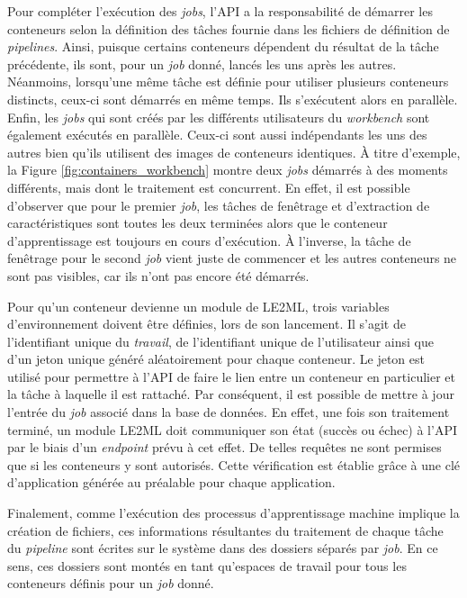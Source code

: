 Pour compléter l'exécution des \emph{jobs}, l'\acs{API} a la responsabilité de démarrer les conteneurs selon la définition des tâches fournie dans les fichiers de définition de \textit{pipelines}. Ainsi, puisque certains conteneurs dépendent du résultat de la tâche précédente, ils sont, pour un \emph{job} donné, lancés les uns après les autres. Néanmoins, lorsqu'une même tâche est définie pour utiliser plusieurs conteneurs distincts, ceux-ci sont démarrés en même temps. Ils s'exécutent alors en parallèle. Enfin, les \emph{jobs} qui sont créés par les différents utilisateurs du \textit{workbench} sont également exécutés en parallèle. Ceux-ci sont aussi indépendants les uns des autres bien qu'ils utilisent des images de conteneurs identiques. À titre d'exemple, la Figure \ref{fig:containers_workbench} montre deux \emph{jobs} démarrés à des moments différents, mais dont le traitement est concurrent. En effet, il est possible d'observer que pour le premier \emph{job}, les tâches de fenêtrage et d'extraction de caractéristiques sont toutes les deux terminées alors que le conteneur d'apprentissage est toujours en cours d'exécution. À l'inverse, la tâche de fenêtrage pour le second \emph{job} vient juste de commencer et les autres conteneurs ne sont pas visibles, car ils n'ont pas encore été démarrés.

Pour qu'un conteneur devienne un module de \acs{LE2ML}, trois variables d'environnement doivent être définies, lors de son lancement. Il s'agit de l'identifiant unique du \emph{travail}, de l'identifiant unique de l'utilisateur ainsi que d'un jeton unique généré aléatoirement pour chaque conteneur. Le jeton est utilisé pour permettre à l'\acs{API} de faire le lien entre un conteneur en particulier et la tâche à laquelle il est rattaché. Par conséquent, il est possible de mettre à jour l'entrée du \emph{job} associé dans la base de données. En effet, une fois son traitement terminé, un module LE2ML doit communiquer son état (succès ou échec) à l'\acs{API} par le biais d'un \textit{endpoint} prévu à cet effet. De telles requêtes ne sont permises que si les conteneurs y sont autorisés. Cette vérification est établie grâce à une clé d'application générée au préalable pour chaque application.

Finalement, comme l'exécution des processus d'apprentissage machine implique la création de fichiers, ces informations résultantes du traitement de chaque tâche du \textit{pipeline} sont écrites sur le système dans des dossiers séparés par \emph{job}. En ce sens, ces dossiers sont montés en tant qu'espaces de travail pour tous les conteneurs définis pour un \emph{job} donné.

